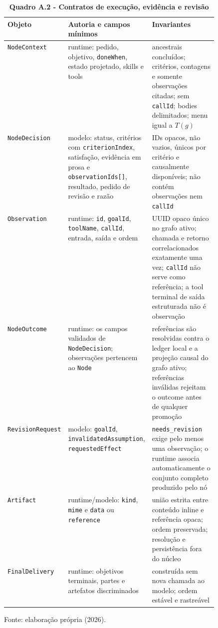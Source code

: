 \begin{table}[H]
\centering
\caption*{\textbf{Quadro A.2 - Contratos de execução, evidência e revisão}}
\scriptsize
\renewcommand{\arraystretch}{1.12}
\begin{tabularx}{\linewidth}{|p{0.18\linewidth}|p{0.31\linewidth}|Y|}
\hline
\textbf{Objeto} & \textbf{Autoria e campos mínimos} & \textbf{Invariantes} \\
\hline
\texttt{NodeContext} &
runtime: pedido, objetivo, \texttt{doneWhen}, estado projetado, skills e tools &
ancestrais concluídos; critérios, contagens e somente observações citadas;
sem \texttt{callId}; bodies delimitados; menu igual a \(T(g)\) \\
\hline
\texttt{NodeDecision} &
modelo: status, critérios com \texttt{criterionIndex}, satisfação, evidência em prosa e
\texttt{observationIds[]}, resultado, pedido de revisão e razão &
IDs opacos, não vazios, únicos por critério e causalmente disponíveis; não contém
observações nem \texttt{callId} \\
\hline
\texttt{Observation} &
runtime: \texttt{id}, \texttt{goalId}, \texttt{toolName}, \texttt{callId}, entrada, saída e ordem &
UUID opaco único no grafo ativo; chamada e retorno correlacionados exatamente uma vez;
\texttt{callId} não serve como referência;
a tool terminal de saída estruturada não é observação \\
\hline
\texttt{NodeOutcome} &
runtime: os campos validados de \texttt{NodeDecision}; observações pertencem ao \texttt{Node} &
referências são resolvidas contra o ledger local e a projeção causal do grafo ativo;
referências inválidas rejeitam o outcome antes de qualquer promoção \\
\hline
\texttt{RevisionRequest} &
modelo: \texttt{goalId}, \texttt{invalidatedAssumption}, \texttt{requestedEffect} &
\texttt{needs\_revision} exige pelo menos uma observação; o runtime associa
automaticamente o conjunto completo produzido pelo nó \\
\hline
\texttt{Artifact} &
runtime/modelo: \texttt{kind}, \texttt{mime} e \texttt{data} ou \texttt{reference} &
união estrita entre conteúdo inline e referência opaca; ordem preservada;
resolução e persistência fora do núcleo \\
\hline
\texttt{FinalDelivery} &
runtime: objetivos terminais, partes e artefatos discriminados &
construída sem nova chamada ao modelo; ordem estável e rastreável \\
\hline
\end{tabularx}
\par\smallskip\raggedright\small Fonte: elaboração própria (2026).
\end{table}
